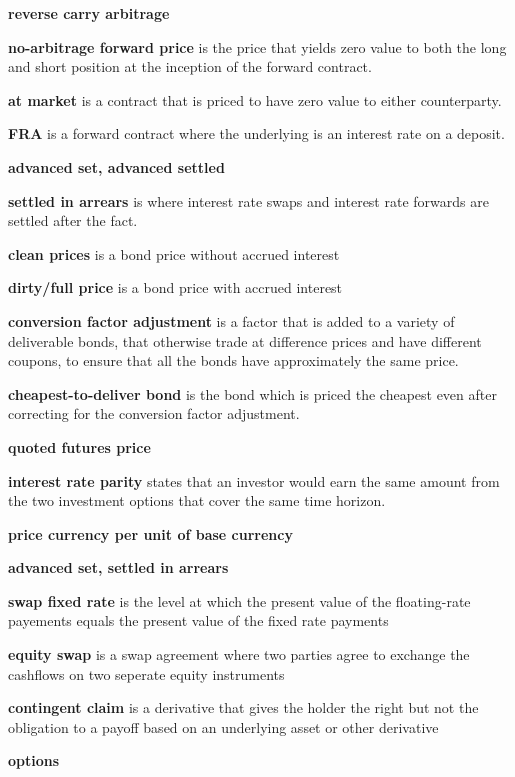 \documentclass[12pt]{article}
\begin{document}
\textbf{reverse carry arbitrage}

\textbf{no-arbitrage forward price} is the price that yields zero value to both the long and short position at the inception of the forward contract. 

\textbf{at market} is a contract that is priced to have zero value to either counterparty.

\textbf{FRA} is a forward contract where the underlying is an interest rate on a deposit. 



\textbf{advanced set, advanced settled}

\textbf{settled in arrears} is where interest rate swaps and interest rate forwards are settled after the fact. 

\textbf{clean prices} is a bond price without accrued interest

\textbf{dirty/full price} is a bond price with accrued interest

\textbf{conversion factor adjustment} is a factor that is added to a variety of deliverable bonds, that otherwise trade at difference prices and have different coupons, to ensure that all the bonds have approximately the same price. 

\textbf{cheapest-to-deliver bond} is the bond which is priced the cheapest even after correcting for the conversion factor adjustment. 

\textbf{quoted futures price} 


\textbf{interest rate parity} states that an investor would earn the same amount from the two investment options that cover the same time horizon. 

\textbf{price currency per unit of base currency}

\newpage

\textbf{advanced set, settled in arrears}

\textbf{swap fixed rate} is the level at which the present value of the floating-rate payements equals the present value of the fixed rate payments

\textbf{equity swap} is a swap agreement where two parties agree to exchange the cashflows on two seperate equity instruments

\newpage

\textbf{contingent claim} is a derivative that gives the holder the right but not the obligation to a payoff based on an underlying asset or other derivative

\textbf{options} 
\end{document}
